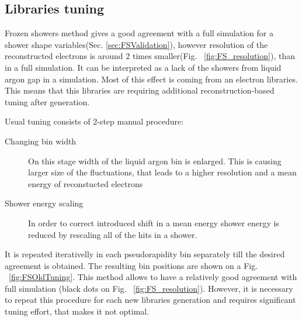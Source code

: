 \begin{figure}[!tbp]
\end{figure}

\begin{figure}[!tbp]
\end{figure}

\subsection{Libraries tuning}

Frozen showers method gives a good agreement with a full simulation for a shower shape variables(Sec. \ref{sec:FSValidation}), however resolution of the reconstructed electrons is around 2 times smaller(Fig. ~\ref{fig:FS_resolution}), than in a full simulation. It can be interpreted as a lack of the showers from liquid argon gap in a simulation. Most of this effect is coming from an electron libraries. This means that this libraries are requiring additional reconstruction-based tuning after generation.

Usual tuning consists of 2-step manual procedure:
\begin{description}
\item [Changing bin width] On this stage width of the liquid argon bin is enlarged. This is causing larger size of the fluctuations, that leads to a higher resolution and a mean energy of reconstucted electrons
\item [Shower energy scaling] In order to correct introduced shift in a mean energy shower energy is reduced by rescaling all of the hits in a shower.
\end{description}
 It is repeated iterativelly in each pseudorapidity bin separately till the desired agreement is obtained. The resulting bin positions are shown on a Fig.  ~\ref{fig:FSOldTuning}. This method allows to have a relatively good agreement with full simulation (black dots on Fig. ~\ref{fig:FS_resolution}). However, it is necessary to repeat this procedure for each new libraries generation and requires significant tuning effort, that makes it not optimal. 

